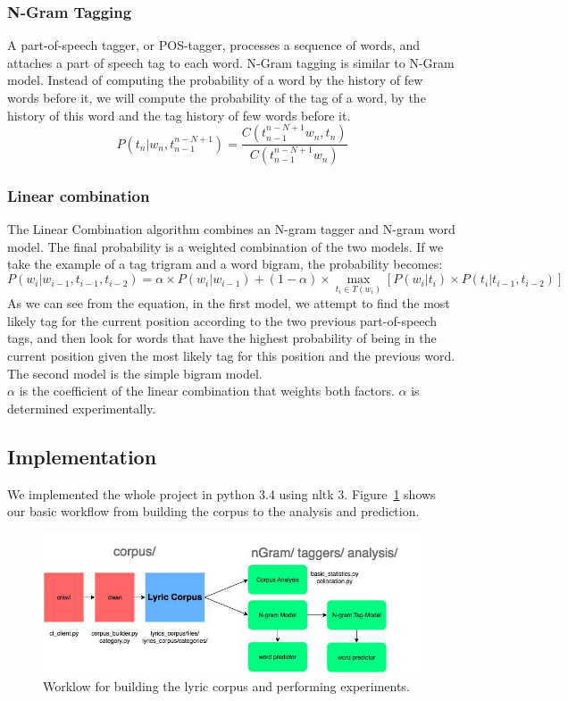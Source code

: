 \documentclass[a4paper,12pt]{article}
\begin{document}
\subsubsection{N-Gram Tagging}
A part-of-speech tagger, or POS-tagger, processes a sequence of words, and attaches a part of speech tag to each word.\cite{NLTK} N-Gram tagging is similar to N-Gram model. Instead of computing the probability of a word by the history of few words before it, we will compute the probability of the tag of a word, by the history of this word and the tag history of few words before it.
\begin{equation}
P(t_n|w_n,t_{n-1}^{n-N+1}) = \frac{C(t_{n-1}^{n-N+1} w_{n},t_{n})}{C(t_{n-1}^{n-N+1}w_{n})}
\end{equation}

\subsubsection{Linear combination}
The Linear Combination algorithm \cite{tagging} combines an N-gram tagger and N-gram word model. The final probability is a weighted combination of the two models. If we take the example of a tag trigram and a word bigram, the probability becomes:
\begin{equation}
P(w_i|w_{i-1},t_{i-1},t_{i-2}) 
=\alpha \times P(w_{i}|w_{i-1})+(1 - \alpha) \times \max_{t_i \in T(w_i)}[P(w_i|t_i) \times P(t_i|t_{i-1},t_{i-2})]
\end{equation}
As we can see from the equation, in the first model, we attempt to find the most likely tag for the current position according
to the two previous part-of-speech tags, and then
look for words that have the highest probability of
being in the current position given the most likely
tag for this position and the previous word. The second model is the simple bigram model. \\
$\alpha$ is the coefficient of the linear combination that weights both factors. $\alpha$ is determined experimentally.
 
\subsection{Implementation}

We implemented the whole project in python 3.4 using nltk 3. Figure~\ref{fig:workflow} shows our basic workflow from building the corpus to the analysis and prediction.

\begin{figure}
\centering
\includegraphics[width=1\linewidth]{workflow}
\caption{Worklow for building the lyric corpus and performing experiments.}
\label{fig:workflow}
\end{figure}
\end{document}
